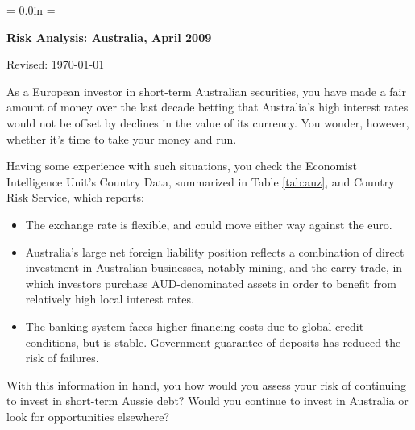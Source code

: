 \documentclass[letterpaper,12pt]{exam}
\def\HeadName{Risk Analysis:  Australia, April 2009}
\begin{document}
\parindent = 0.0in
\parskip = \bigskipamount
\thispagestyle{empty}%
\Head

\centerline{\large \bf \HeadName}%
\centerline{Revised:  \today}

\bigskip
As a European investor in short-term Australian securities, 
you have made a fair amount of money over the last decade
betting that Australia's high interest rates would not 
be offset by declines in the value of its currency.  
You wonder, however, whether it's time to take your money 
and run.  

Having some experience with such situations, 
you check the Economist Intelligence Unit's Country Data, 
summarized in Table \ref{tab:auz}, 
and Country Risk Service, 
which reports:  
%
\begin{itemize}
\item The exchange rate is flexible, and could move either way against
the euro.  
\item Australia's large net foreign liability position reflects 
a combination of direct investment in Australian businesses, 
notably mining, 
and the carry trade, 
in which investors purchase AUD-denominated assets 
in order to benefit from relatively high local interest rates.  
\item The banking system faces higher financing costs due to global 
credit conditions, but is stable.  Government guarantee of deposits
has reduced the risk of failures. 
\end{itemize}

With this information in hand, you how would you assess your risk 
of continuing to invest in short-term Aussie debt?  
Would you continue to invest in Australia or look for 
opportunities elsewhere?  
\end{document}
